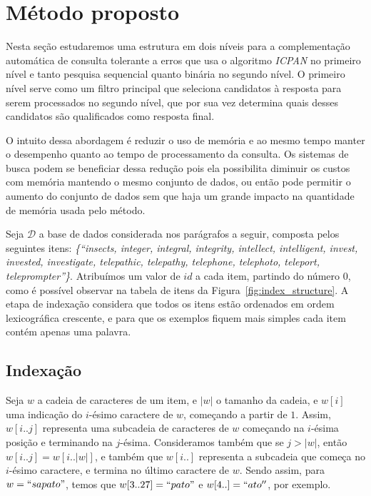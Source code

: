 \section{Método proposto} \label{sec:metodo}

Nesta seção estudaremos uma estrutura em dois níveis para a complementação automática de consulta tolerante a erros que usa o algoritmo \textit{ICPAN} no primeiro nível e tanto pesquisa sequencial quanto binária no segundo nível. O primeiro nível serve como um filtro principal que seleciona candidatos à resposta para serem processados no segundo nível, que por sua vez determina quais desses candidatos são qualificados como resposta final.

O intuito dessa abordagem é reduzir o uso de memória e ao mesmo tempo manter o desempenho quanto ao tempo de processamento da consulta. Os sistemas de busca podem se beneficiar dessa redução pois ela possibilita diminuir os custos com memória mantendo o mesmo conjunto de dados, ou então pode permitir o aumento do conjunto de dados sem que haja um grande impacto na quantidade de memória usada pelo método.

Seja $\mathcal{D}$ a base de dados considerada nos parágrafos a seguir, composta pelos seguintes itens: \textit{\{``insects, integer, integral, integrity, intellect, intelligent, invest, invested, investigate, telepathic, telepathy, telephone, telephoto, teleport, teleprompter''\}}. Atribuímos um valor de $id$ a cada item, partindo do número $0$, como é possível observar na tabela de itens da Figura~\ref{fig:index_structure}. A etapa de indexação considera que todos os itens estão ordenados em ordem lexicográfica crescente, e para que os exemplos fiquem mais simples cada item contém apenas uma palavra.
 
\subsection{Indexação} 
\label{sec:indexing}
Seja $w$ a cadeia de caracteres de um item, e $|w|$ o tamanho da cadeia, e $w[i]$ uma indicação do $i$-ésimo caractere de $w$, começando a partir de $1$. Assim, $w[i..j]$ representa uma subcadeia de caracteres de $w$ começando na $i$-ésima posição e terminando na $j$-ésima. Consideramos também que se $j > |w|$, então $w[i..j] = w[i..|w|]$, e também que $w[i..]$ representa a subcadeia que começa no $i$-ésimo caractere, e termina no último caractere de $w$. Sendo assim, para $w = ``sapato"$, temos que $w[3..27] =  ``pato"$ e $w[4..] = ``ato''$, por exemplo.  

